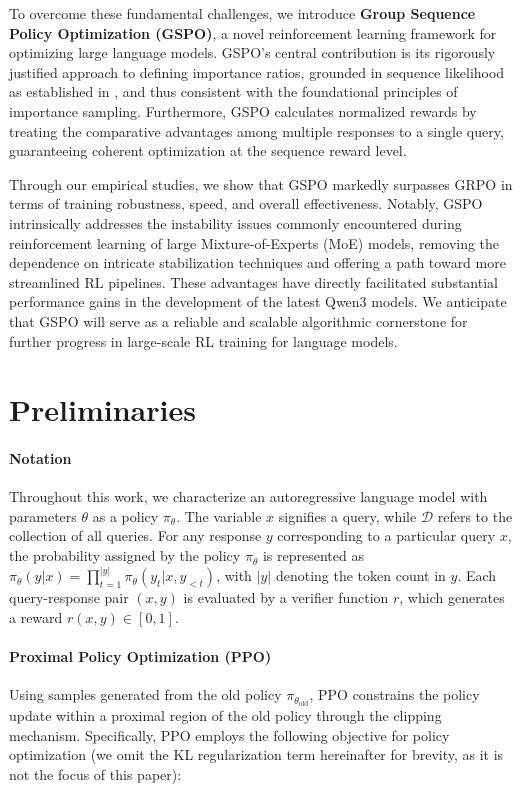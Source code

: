 To overcome these fundamental challenges, we introduce \textbf{Group Sequence Policy Optimization (GSPO)}, a novel reinforcement learning framework for optimizing large language models. GSPO's central contribution is its rigorously justified approach to defining importance ratios, grounded in sequence likelihood as established in \citep{click}, and thus consistent with the foundational principles of importance sampling. Furthermore, GSPO calculates normalized rewards by treating the comparative advantages among multiple responses to a single query, guaranteeing coherent optimization at the sequence reward level.

Through our empirical studies, we show that GSPO markedly surpasses GRPO in terms of training robustness, speed, and overall effectiveness. Notably, GSPO intrinsically addresses the instability issues commonly encountered during reinforcement learning of large Mixture-of-Experts (MoE) models, removing the dependence on intricate stabilization techniques and offering a path toward more streamlined RL pipelines. These advantages have directly facilitated substantial performance gains in the development of the latest Qwen3 models. We anticipate that GSPO will serve as a reliable and scalable algorithmic cornerstone for further progress in large-scale RL training for language models.

\section{Preliminaries}

\paragraph{Notation}
Throughout this work, we characterize an autoregressive language model with parameters $\theta$ as a policy $\pi_\theta$.
The variable $x$ signifies a query, while $\mathcal{D}$ refers to the collection of all queries. For any response $y$ corresponding to a particular query $x$, the probability assigned by the policy $\pi_\theta$ is represented as $\pi_\theta (y | x)=\prod_{t=1}^{|y|} \pi_\theta (y_t | x, y_{<t} )$, with $|y|$ denoting the token count in $y$. Each query-response pair $(x, y)$ is evaluated by a verifier function $r$, which generates a reward $r(x, y) \in [ 0, 1 ]$.

\paragraph{Proximal Policy Optimization (PPO)} Using samples generated from the old policy $\pi_{\theta_\text{old}}$, PPO \citep{ppo} constrains the policy update within a proximal region of the old policy through the clipping mechanism. Specifically, PPO employs the following objective for policy optimization (we omit the KL regularization term hereinafter for brevity, as it is not the focus of this paper):

